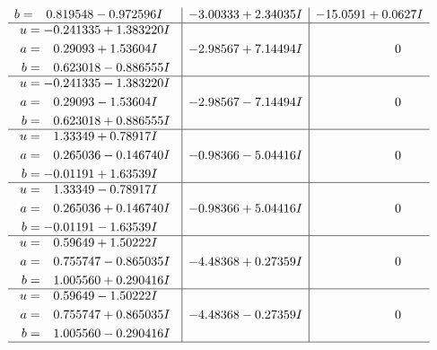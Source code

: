 \documentclass[1p]{elsarticle_modified}
\theoremstyle{definition}
\begin{document}
$$\begin{array}{c|c|c}
\begin{aligned}
b &= \phantom{-}0.819548 - 0.972596 I\end{aligned}
 & -3.00333 + 2.34035 I & -15.0591 + 0.0627 I \\ \hline\begin{aligned}
u &= -0.241335 + 1.383220 I \\
a &= \phantom{-}0.29093 + 1.53604 I \\
b &= \phantom{-}0.623018 - 0.886555 I\end{aligned}
 & -2.98567 + 7.14494 I & \phantom{-0.000000 } 0 \\ \hline\begin{aligned}
u &= -0.241335 - 1.383220 I \\
a &= \phantom{-}0.29093 - 1.53604 I \\
b &= \phantom{-}0.623018 + 0.886555 I\end{aligned}
 & -2.98567 - 7.14494 I & \phantom{-0.000000 } 0 \\ \hline\begin{aligned}
u &= \phantom{-}1.33349 + 0.78917 I \\
a &= \phantom{-}0.265036 - 0.146740 I \\
b &= -0.01191 + 1.63539 I\end{aligned}
 & -0.98366 - 5.04416 I & \phantom{-0.000000 } 0 \\ \hline\begin{aligned}
u &= \phantom{-}1.33349 - 0.78917 I \\
a &= \phantom{-}0.265036 + 0.146740 I \\
b &= -0.01191 - 1.63539 I\end{aligned}
 & -0.98366 + 5.04416 I & \phantom{-0.000000 } 0 \\ \hline\begin{aligned}
u &= \phantom{-}0.59649 + 1.50222 I \\
a &= \phantom{-}0.755747 - 0.865035 I \\
b &= \phantom{-}1.005560 + 0.290416 I\end{aligned}
 & -4.48368 + 0.27359 I & \phantom{-0.000000 } 0 \\ \hline\begin{aligned}
u &= \phantom{-}0.59649 - 1.50222 I \\
a &= \phantom{-}0.755747 + 0.865035 I \\
b &= \phantom{-}1.005560 - 0.290416 I\end{aligned}
 & -4.48368 - 0.27359 I & \phantom{-0.000000 } 0\\
 \hline 
 \end{array}$$\newpage$$\begin{array}{c|c|c}  

\end{array}$$
\end{document}
